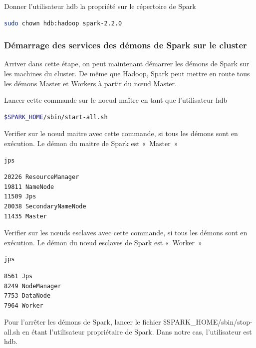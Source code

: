 \documentclass[12pt,english]{book}
\begin{document}
Donner l’utilisateur hdb la propriété sur le répertoire de Spark

\begin{lstlisting}[language=bash, frame=single]
sudo chown hdb:hadoop spark-2.2.0
\end{lstlisting}

\subsubsection{Démarrage des services des démons de Spark sur le cluster}

Arriver dans cette étape, on peut maintenant démarrer les démons de Spark sur les machines du cluster. De même que Hadoop, Spark peut mettre en route tous les démons Master et Workers à partir du nœud Master.

Lancer cette commande sur le noeud maître en tant que l’utilisateur hdb

\begin{lstlisting}[language=bash, frame=single]
$SPARK_HOME/sbin/start-all.sh 
\end{lstlisting}

Verifier sur le nœud maitre avec cette commande, si tous les démons sont en exécution. Le démon du maitre de Spark est « Master »

\begin{lstlisting}[language=bash, frame=single]
jps
\end{lstlisting}

\begin{lstlisting}[language=bash, frame=single]
20226 ResourceManager
19811 NameNode
11509 Jps
20038 SecondaryNameNode
11435 Master
\end{lstlisting}

Verifier sur les nœuds esclaves avec cette commande, si tous les démons sont en exécution. Le démon du nœud esclaves de Spark est « Worker »

\begin{lstlisting}[language=bash, frame=single]
jps
\end{lstlisting}

\begin{lstlisting}[language=bash, frame=single]
8561 Jps
8249 NodeManager
7753 DataNode
7964 Worker
\end{lstlisting}

Pour l’arrêter les démons de Spark, lancer le fichier \$SPARK\_HOME/sbin/stop-all.sh en étant l’utilisateur propriétaire de Spark.
Dans notre cas, l’utilisateur est hdb. 
\end{document}

